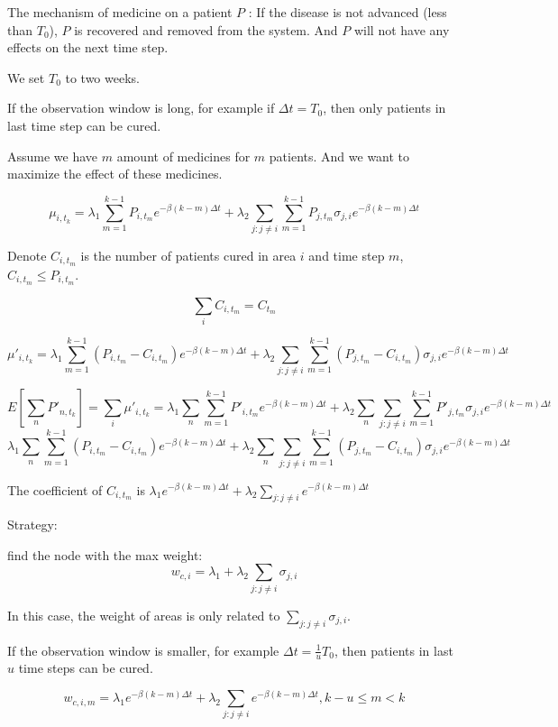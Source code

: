 \documentclass[11pt]{article}
\begin{document}
\label{str}
The mechanism of medicine on a patient $P$ : If the disease is not advanced (less than $T_0$), $P$ is recovered and removed from the system. And $P$ will not have any effects on the next time step.

We set $T_0$ to two weeks. 

If the observation window is long, for example if $\Delta t= T_0$, then only patients in last time step can be cured.

Assume we have $m$ amount of medicines for $m$ patients. And we want to maximize the effect of these medicines.

$$\mu_{i,t_k} = \lambda_1 \sum_{m = 1}^{ k-1} P_{i,t_m} e^{-\beta(k-m)\Delta t} + \lambda_2 \sum_{j:j\neq i} \sum_{m = 1}^{ k-1} P_{j,t_m} \sigma_{j,i} e^{-\beta(k-m)\Delta t}$$

Denote $C_{i,t_m}$ is the number of patients cured in area $i$ and time step $m$, $C_{i,t_m} \leq P_{i,t_m}$.

$$\sum_i C_{i,t_m} = C_{t_m}$$

$$\mu'_{i,t_k} = \lambda_1 \sum_{m = 1}^{ k-1} (P_{i,t_m} - C_{i,t_m}) e^{-\beta(k-m)\Delta t} + \lambda_2 \sum_{j:j\neq i} \sum_{m = 1}^{ k-1} (P_{j,t_m}-C_{i,t_m}) \sigma_{j,i} e^{-\beta(k-m)\Delta t}$$

$$
E[\sum_n {P'_{n,t_k}}] = \sum_i \mu'_{i,t_k} = \lambda_1 \sum_n \sum_{m = 1}^{ k-1} P'_{i,t_m} e^{-\beta(k-m)\Delta t} + \lambda_2 \sum_n \sum_{j:j\neq i} \sum_{m = 1}^{ k-1} P'_{j,t_m} \sigma_{j,i} e^{-\beta(k-m)\Delta t}
$$
$$
\lambda_1 \sum_n \sum_{m = 1}^{ k-1} (P_{i,t_m} - C_{i,t_m}) e^{-\beta(k-m)\Delta t} + \lambda_2 \sum_n \sum_{j:j\neq i} \sum_{m = 1}^{ k-1} (P_{j,t_m} - C_{i,t_m}) \sigma_{j,i} e^{-\beta(k-m)\Delta t}
$$

The coefficient of $C_{i,t_m}$ is $\lambda_1 e^{-\beta(k-m)\Delta t} + \lambda_2 \sum_{j:j\neq i} e^{-\beta(k-m) \Delta t}$

Strategy: 

find the node with the max weight:
 $$w_{c,i} = \lambda_1 + \lambda_2 \sum_{j:j\neq i} \sigma_{j,i}$$
 
In this case, the weight of areas is only related to $\sum_{j:j\neq i} \sigma_{j,i}$.


If the observation window is smaller, for example $\Delta t = \frac{1}{u} T_0$, then patients in last $u$ time steps can be cured. 

$$w_{c,i,m} = \lambda_1 e^{-\beta(k-m)\Delta t} + \lambda_2 \sum_{j:j\neq i} e^{-\beta(k-m) \Delta t}, k-u\leq m < k$$
\end{document}
